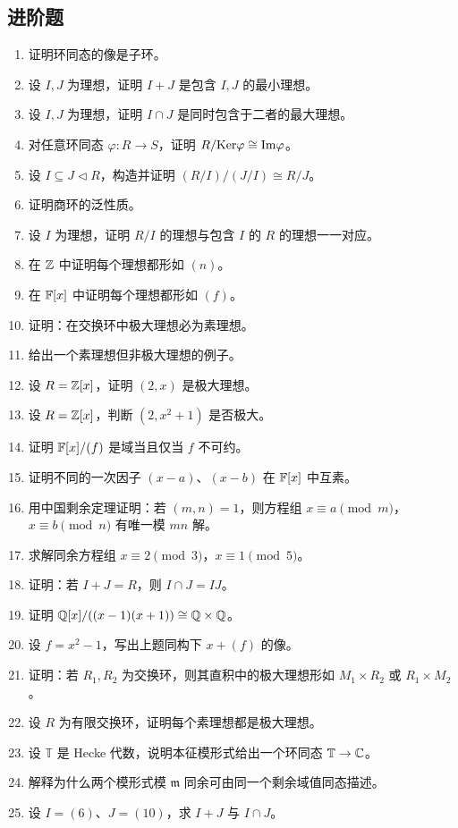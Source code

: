 \subsection*{进阶题}
\begin{enumerate}[resume, label=\textbf{\arabic*.}, leftmargin=*, itemsep=0.5em]
\item \medium 证明环同态的像是子环。
\item \medium 设 $I,J$ 为理想，证明 $I+J$ 是包含 $I,J$ 的最小理想。
\item \medium 设 $I,J$ 为理想，证明 $I\cap J$ 是同时包含于二者的最大理想。
\item \medium 对任意环同态 $\varphi:R\to S$，证明 $R/\mathrm{Ker}\varphi\cong \mathrm{Im}\varphi$。
\item \medium 设 $I\subseteq J\triangleleft R$，构造并证明 $(R/I)/(J/I)\cong R/J$。
\item \medium 证明商环的泛性质。
\item \medium 设 $I$ 为理想，证明 $R/I$ 的理想与包含 $I$ 的 $R$ 的理想一一对应。
\item \medium 在 $\mathbb{Z}$ 中证明每个理想都形如 $(n)$。
\item \medium 在 $\mathbb{F}[x]$ 中证明每个理想都形如 $(f)$。
\item \medium 证明：在交换环中极大理想必为素理想。
\item \medium 给出一个素理想但非极大理想的例子。
\item \medium 设 $R=\mathbb{Z}[x]$，证明 $(2,x)$ 是极大理想。
\item \medium 设 $R=\mathbb{Z}[x]$，判断 $(2,x^2+1)$ 是否极大。
\item \medium 证明 $\mathbb{F}[x]/(f)$ 是域当且仅当 $f$ 不可约。
\item \medium 证明不同的一次因子 $(x-a)$、$(x-b)$ 在 $\mathbb{F}[x]$ 中互素。
\item \medium 用中国剩余定理证明：若 $(m,n)=1$，则方程组
$x\equiv a\pmod m$，$x\equiv b\pmod n$ 有唯一模 $mn$ 解。
\item \medium 求解同余方程组 $x\equiv 2\pmod 3$，$x\equiv 1\pmod 5$。
\item \medium 证明：若 $I+J=R$，则 $I\cap J=IJ$。
\item \medium 证明 $\mathbb{Q}[x]/((x-1)(x+1))\cong \mathbb{Q}\times \mathbb{Q}$。
\item \medium 设 $f=x^2-1$，写出上题同构下 $x+(f)$ 的像。
\item \medium 证明：若 $R_1,R_2$ 为交换环，则其直积中的极大理想形如 $M_1\times R_2$ 或 $R_1\times M_2$。
\item \medium 设 $R$ 为有限交换环，证明每个素理想都是极大理想。
\item \medium 设 $\mathbb{T}$ 是 Hecke 代数，说明本征模形式给出一个环同态 $\mathbb{T}\to \mathbb{C}$。
\item \medium 解释为什么两个模形式模 $\mathfrak m$ 同余可由同一个剩余域值同态描述。
\item \medium 设 $I=(6)$、$J=(10)$，求 $I+J$ 与 $I\cap J$。
\end{enumerate}
